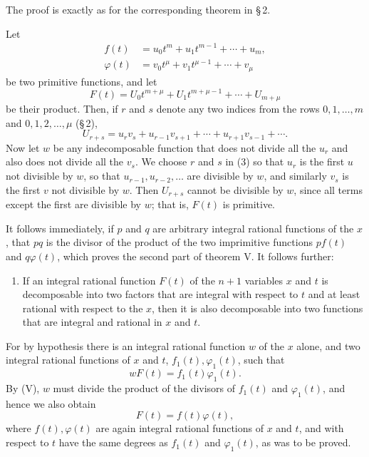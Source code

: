 \documentclass[11pt]{article}
\begin{document}
The proof is exactly as for the corresponding theorem in \S\,2.

Let
\begin{equation}
\begin{aligned}
f(t)&=u_0t^m+u_1t^{m-1}+\cdots+u_m,\\
\varphi(t)&=v_0t^\mu+v_1t^{\mu-1}+\cdots+v_\mu
\end{aligned}
\tag{1}
\end{equation}
be two primitive functions, and let
\begin{equation}
F(t)=U_0t^{m+\mu}+U_1t^{m+\mu-1}+\cdots+U_{m+\mu}
\tag{2}
\end{equation}
be their product. Then, if $r$ and $s$ denote any two indices from the rows $0,1,\ldots,m$ and $0,1,2,
\ldots,\mu$ (\S\,2),
\begin{equation}
U_{r+s}=u_rv_s+u_{r-1}v_{s+1}+\cdots+u_{r+1}v_{s-1}+\cdots.
\tag{3}
\end{equation}
Now let $w$ be any indecomposable function that does not divide all the $u_r$ and also does not divide all the $v_s$. We choose $r$ and $s$ in (3) so that $u_r$ is the first $u$ not divisible by $w$, so that $u_{r-1},u_{r-2},\ldots$ are divisible by $w$, and similarly $v_s$ is the first $v$ not divisible by $w$. Then $U_{r+s}$ cannot be divisible by $w$, since all terms except the first are divisible by $w$; that is, $F(t)$ is primitive.

It follows immediately, if $p$ and $q$ are arbitrary integral rational functions of the $x$, that $pq$ is the divisor of the product of the two imprimitive functions $pf(t)$ and $q\varphi(t)$, which proves the second part of theorem V. It follows further:

\begin{enumerate}[label=\Roman*.,leftmargin=2.4em,start=6]
\item If an integral rational function $F(t)$ of the $n+1$ variables $x$ and $t$ is decomposable into two factors that are integral with respect to $t$ and at least rational with respect to the $x$, then it is also decomposable into two functions that are integral and rational in $x$ and $t$.
\end{enumerate}

For by hypothesis there is an integral rational function $w$ of the $x$ alone, and two integral rational functions of $x$ and $t$, $f_1(t),\varphi_1(t)$, such that
\[
wF(t)=f_1(t)\varphi_1(t).
\]
By (V), $w$ must divide the product of the divisors of $f_1(t)$ and $\varphi_1(t)$, and hence we also obtain
\[
F(t)=f(t)\varphi(t),
\]
where $f(t),\varphi(t)$ are again integral rational functions of $x$ and $t$, and with respect to $t$ have the same degrees as $f_1(t)$ and $\varphi_1(t)$, as was to be proved.
\end{document}
